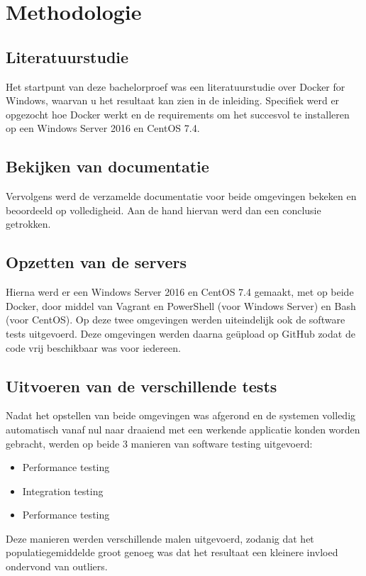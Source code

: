 
\chapter{Methodologie}
\label{ch:methodologie}


\section{Literatuurstudie}
Het startpunt van deze bachelorproef was een literatuurstudie over Docker for Windows, waarvan u het resultaat kan zien in de inleiding. Specifiek werd er opgezocht hoe Docker werkt en de requirements om het succesvol te installeren op een Windows Server 2016 en CentOS 7.4.

\section{Bekijken van documentatie}
Vervolgens werd de verzamelde documentatie voor beide omgevingen bekeken en beoordeeld op volledigheid. Aan de hand hiervan werd dan een conclusie getrokken.

\section{Opzetten van de servers}
Hierna werd er een Windows Server 2016 en CentOS 7.4 gemaakt, met op beide Docker, door middel van Vagrant en PowerShell (voor Windows Server) en Bash (voor CentOS). Op deze twee omgevingen werden uiteindelijk ook de software tests uitgevoerd. Deze omgevingen werden daarna geüpload op GitHub zodat de code vrij beschikbaar was voor iedereen.

\section{Uitvoeren van de verschillende tests}
Nadat het opstellen van beide omgevingen was afgerond en de systemen volledig automatisch vanaf nul naar draaiend met een werkende applicatie konden worden gebracht, werden op beide 3 manieren van software testing uitgevoerd:
\begin{itemize}[noitemsep]
	\item Performance testing
	\item Integration testing
	\item Performance testing
\end{itemize}
Deze manieren werden verschillende malen uitgevoerd, zodanig dat het populatiegemiddelde groot genoeg was dat het resultaat een kleinere invloed ondervond van outliers.

